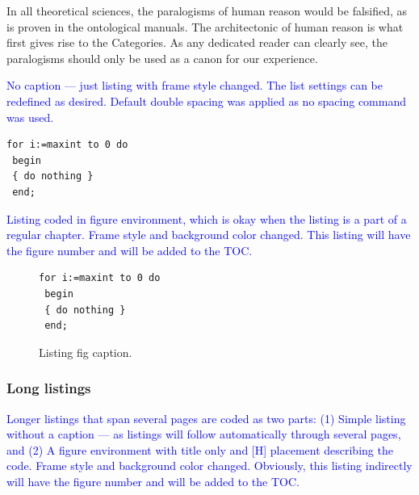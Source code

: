 \documentclass[phd,showframe]{ndsu-thesis-2022}
\newcommand\italk[1]{\textcolor{blue}{#1}}  %
\begin{document}
In all theoretical sciences, the paralogisms of human reason would be falsified, as is proven in the ontological manuals. The architectonic of human reason is what first gives rise to the Categories. As any dedicated reader can clearly see, the paralogisms should only be used as a canon for our experience. 

\italk{No caption --- just listing with frame style changed. The list settings can be redefined as desired. Default double spacing was applied as no spacing command was used.}
\vspace{3mm}

\lstset{frameround=fttt}
\begin{lstlisting}[frame=trBL, caption={}]
 for i:=maxint to 0 do
 begin
 { do nothing }
 end;
\end{lstlisting}

\kant[9]
\italk{Listing coded in figure environment, which is okay when the listing is a part of a regular chapter. Frame style and background color changed. This listing will have the figure number and will be added to the TOC.}

\begin{figure}[ht!]
{\singlespacing
\lstset{frameround=fttt}
\begin{lstlisting}[frame=trBL, backgroundcolor=\color{blue!10!white}]
 for i:=maxint to 0 do
 begin
 { do nothing }
 end;
\end{lstlisting}
}
\caption{Listing fig caption.}
\end{figure}

\subsubsection{Long listings}

\italk{Longer listings that span several pages are coded as two parts: (1) Simple listing without a caption --- as listings will follow automatically through several pages, and (2) A figure environment with title only and [H] placement describing the code. Frame style and background color changed. Obviously, this listing indirectly will have the figure number and will be added to the TOC.}
\end{document}
